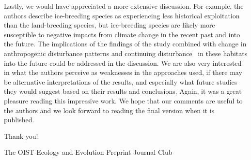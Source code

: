 \documentclass[10pt]{article}
\begin{document}
\par\null

Lastly, we would have appreciated a more extensive discussion. For
example, the authors describe ice-breeding species as experiencing less
historical exploitation than the land-breeding species, but ice-breeding
species are likely more susceptible to negative impacts from climate
change in the recent past and into the future. The implications of the
findings of the study combined with change in anthropogenic disturbance
patterns and continuing disturbance~ in these habitats into the future
could be addressed in the discussion. We are also very interested in
what the authors perceive as weaknesses in the approaches used, if there
may be alternative interpretations of the results, and especially what
future studies they would suggest based on their results and
conclusions. Again, it was a great pleasure reading this impressive
work. We hope that our comments are useful to the authors and we look
forward to reading the final version when it is published.~

\par\null

Thank you!

\par\null

The OIST Ecology and Evolution Preprint Journal Club~

\par\null\par\null

\FloatBarrier
\end{document}
